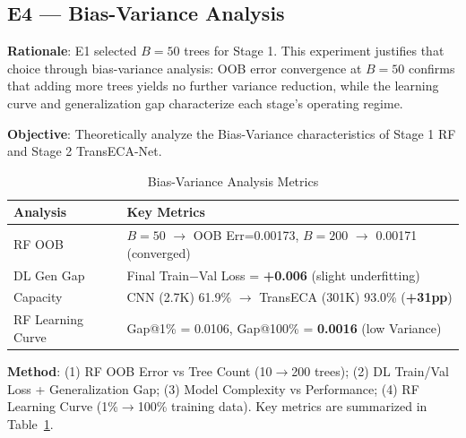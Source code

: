 \documentclass[sigconf]{acmart}
\begin{document}
\subsection{E4 --- Bias-Variance Analysis}
\textbf{Rationale}: E1 selected $B=50$ trees for Stage 1. This experiment justifies that choice through bias-variance analysis: OOB error convergence at $B=50$ confirms that adding more trees yields no further variance reduction, while the learning curve and generalization gap characterize each stage's operating regime.

\textbf{Objective}: Theoretically analyze the Bias-Variance characteristics of Stage 1 RF and Stage 2 TransECA-Net.


\begin{table}[!t]
\caption{Bias-Variance Analysis Metrics}
\label{tab:bias_variance}
\begin{tabular}{ll}
\toprule
\textbf{Analysis} & \textbf{Key Metrics} \\
\midrule
RF OOB & $B=50$ $\to$ OOB Err=0.00173, $B=200$ $\to$ 0.00171 (converged) \\
DL Gen Gap & Final Train$-$Val Loss = \textbf{+0.006} (slight underfitting) \\
Capacity & CNN (2.7K) 61.9\% $\to$ TransECA (301K) 93.0\% (\textbf{+31pp}) \\
RF Learning Curve & Gap@1\% = 0.0106, Gap@100\% = \textbf{0.0016} (low Variance) \\
\bottomrule
\end{tabular}
\end{table}
\textbf{Method}: (1) RF OOB Error vs Tree Count (10$\to$200 trees); (2) DL Train/Val Loss + Generalization Gap; (3) Model Complexity vs Performance; (4) RF Learning Curve (1\%$\to$100\% training data). Key metrics are summarized in Table~\ref{tab:bias_variance}.
\end{document}
